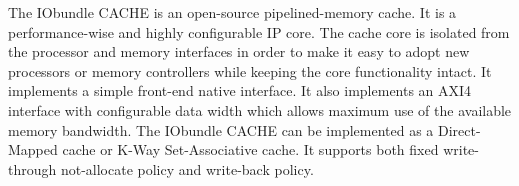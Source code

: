The IObundle CACHE is an open-source pipelined-memory cache. It is a performance-wise and highly configurable IP core. The cache core is isolated from the processor and memory interfaces in order to make it easy to adopt new processors or memory controllers while keeping the core functionality intact. It implements a simple front-end native interface. It also implements an AXI4 interface with configurable data width which allows maximum use of the available memory bandwidth. The IObundle CACHE can be implemented as a Direct-Mapped cache or K-Way Set-Associative cache. It supports both fixed write-through not-allocate policy and write-back policy.
